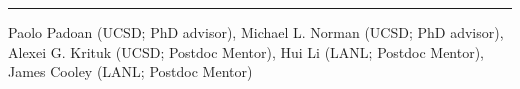 
\rule[3pt]{425.5pt}{.1mm}

\noindent Paolo Padoan (UCSD; PhD advisor), Michael L. Norman (UCSD; PhD
advisor), Alexei G. Krituk (UCSD; Postdoc Mentor), Hui Li (LANL; Postdoc
Mentor), James Cooley (LANL; Postdoc Mentor)
